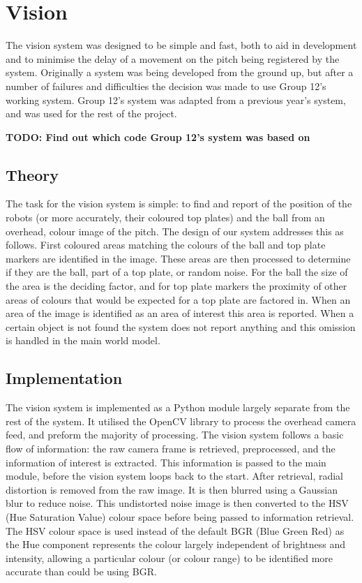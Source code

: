 \newcommand\visiontodo[1]{\textbf{TODO: #1}}

\section{Vision}

The vision system was designed to be simple and fast, both to aid in
development and to minimise the delay of a movement on the pitch being
registered by the system. Originally a system was being developed from the
ground up, but after a number of failures and difficulties the decision was
made to use Group 12's working system. Group 12's system was adapted from a
previous year's system, and was used for the rest of the project.

\visiontodo{Find out which code Group 12's system was based on}

\subsection{Theory}

The task for the vision system is simple: to find and report of the position of
the robots (or more accurately, their coloured top plates) and the ball from an
overhead, colour image of the pitch. The design of our system addresses this as
follows. First coloured areas matching the colours of the ball and top plate
markers are identified in the image. These areas are then processed to
determine if they are the ball, part of a top plate, or random noise. For the
ball the size of the area is the deciding factor, and for top plate markers the
proximity of other areas of colours that would be expected for a top plate are
factored in. When an area of the image is identified as an area of interest
this area is reported. When a certain object is not found the system does not
report anything and this omission is handled in the main world model.

\subsection{Implementation}

The vision system is implemented as a Python module largely separate from the
rest of the system. It utilised the OpenCV library to process the overhead
camera feed, and preform the majority of processing. The vision system follows
a basic flow of information: the raw camera frame is retrieved, preprocessed,
and the information of interest is extracted. This information is passed to the
main module, before the vision system loops back to the start. After retrieval,
radial distortion is removed from the raw image. It is then blurred using a
Gaussian blur to reduce noise. This undistorted noise image is then converted
to the HSV (Hue Saturation Value) colour space before being passed to
information retrieval. The HSV colour space is used instead of the default BGR
(Blue Green Red) as the Hue component represents the colour largely independent
of brightness and intensity, allowing a particular colour (or colour range) to
be identified more accurate than could be using BGR.

